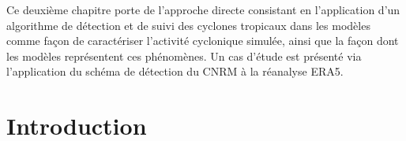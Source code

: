 \documentclass[../main.tex]{subfiles}
\begin{document}
\begin{itshape}
Ce deuxième chapitre porte de l'approche directe consistant en l'application d'un algorithme de détection et de suivi des cyclones tropicaux dans les modèles
comme façon de caractériser l'activité cyclonique simulée, ainsi que la façon dont les modèles représentent ces phénomènes. Un cas d'étude est présenté via
l'application du schéma de détection du CNRM à la réanalyse ERA5.
\end{itshape}

\minitoc\newpage

\section{Introduction}\label{sec:intro_chap2}
\end{document}
